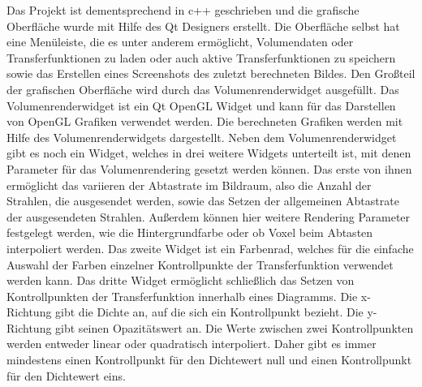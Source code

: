 Das Projekt ist dementsprechend in c++ geschrieben und die grafische Oberfläche wurde mit Hilfe des Qt Designers erstellt.
Die Oberfläche selbst hat eine Menüleiste, die es unter anderem ermöglicht, Volumendaten oder Transferfunktionen zu laden oder auch aktive Transferfunktionen zu speichern sowie das Erstellen eines Screenshots des zuletzt berechneten Bildes.
Den Großteil der grafischen Oberfläche wird durch das Volumenrenderwidget ausgefüllt.
Das Volumenrenderwidget ist ein Qt OpenGL Widget und kann für das Darstellen von OpenGL Grafiken verwendet werden.
Die berechneten Grafiken werden mit Hilfe des Volumenrenderwidgets dargestellt.
Neben dem Volumenrenderwidget gibt es noch ein Widget, welches in drei weitere Widgets unterteilt ist, mit denen Parameter für das Volumenrendering gesetzt werden können.
Das erste von ihnen ermöglicht das variieren der Abtastrate im Bildraum, also die Anzahl der Strahlen, die ausgesendet werden, sowie das Setzen der allgemeinen Abtastrate der ausgesendeten Strahlen.
Außerdem können hier weitere Rendering Parameter festgelegt werden, wie die Hintergrundfarbe oder ob Voxel beim Abtasten interpoliert werden.
Das zweite Widget ist ein Farbenrad, welches für die einfache Auswahl der Farben einzelner Kontrollpunkte der Transferfunktion verwendet werden kann.
Das dritte Widget ermöglicht schließlich das Setzen von Kontrollpunkten der Transferfunktion innerhalb eines Diagramms.
Die x-Richtung gibt die Dichte an, auf die sich ein Kontrollpunkt bezieht.
Die y-Richtung gibt seinen Opazitätswert an.
Die Werte zwischen zwei Kontrollpunkten werden entweder linear oder quadratisch interpoliert.
Daher gibt es immer mindestens einen Kontrollpunkt für den Dichtewert null und einen Kontrollpunkt für den Dichtewert eins.

